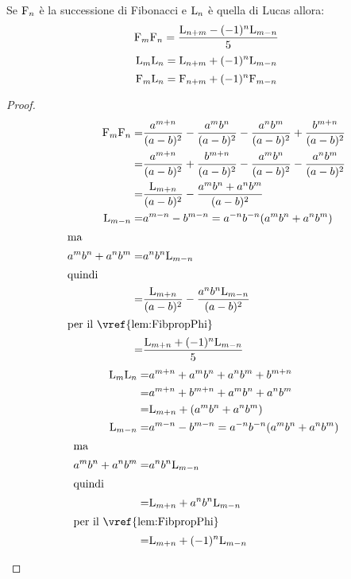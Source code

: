\begin{thm}\label{thm:FibProdSomma}
	Se $\mathrm{F}_{n}$ è la successione di Fibonacci e  $\mathrm{L}_{n}$ è quella di Lucas allora:
	\begin{equation}
		\mathrm{F}_{m}\mathrm{F}_{n}=\dfrac{\mathrm{L}_{n+m}-(-1)^n\mathrm{L}_{m-n}}{5}
	\end{equation}\label{eqn:FibProdSomma}
	\begin{equation}
	\mathrm{L}_{m}\mathrm{L}_{n}=\mathrm{L}_{n+m}+(-1)^n\mathrm{L}_{m-n}
	\end{equation}\label{eqn:LucProdSomma}
\begin{equation}
	\mathrm{F}_{m}\mathrm{L}_{n}=\mathrm{F}_{n+m}+(-1)^n\mathrm{F}_{m-n}
\end{equation}\label{eqn:LucFibProdSomma}
\end{thm}\cite{Rabinowitz_1996}
\begin{proof}
\begin{align*}
	\Fib{m}\Fib{n}=&\dfrac{a^{m+n}}{(a-b)^2}-\dfrac{a^mb^n}{(a-b)^2}-\dfrac{a^nb^m}{(a-b)^2}+\dfrac{b^{m+n}}{(a-b)^2}\\
	=&\dfrac{a^{m+n}}{(a-b)^2}+\dfrac{b^{m+n}}{(a-b)^2}-\dfrac{a^mb^n}{(a-b)^2}-\dfrac{a^nb^m}{(a-b)^2}\\
	=&\dfrac{\Luc{m+n}}{(a-b)^2}-\dfrac{a^mb^n+a^nb^m}{(a-b)^2}\\
	\Luc{m-n}=&a^{m-n}-b^{m-n}=a^{-n}b^{-n}(a^mb^n+a^nb^m)\\
	\intertext{ma}
	a^mb^n+a^nb^m=&a^{n}b^{n}\Luc{m-n}\\
	\intertext{quindi}
	=&\dfrac{\Luc{m+n}}{(a-b)^2}-\dfrac{a^{n}b^{n}\Luc{m-n}}{(a-b)^2}\\
	\intertext{per il~\vref{lem:FibpropPhi}}
	=&\dfrac{\Luc{m+n}+(-1)^{n}\Luc{m-n}}{5}
\end{align*}
\begin{align*}
	\Luc{m}\Luc{n}=&a^{m+n}+a^mb^n+a^nb^m+b^{m+n}\\
	=&a^{m+n}+b^{m+n}+a^mb^n+a^nb^m\\
	=&\Luc{m+n}+(a^mb^n+a^nb^m)\\
	\Luc{m-n}=&a^{m-n}-b^{m-n}=a^{-n}b^{-n}(a^mb^n+a^nb^m)\\
	\intertext{ma}
	a^mb^n+a^nb^m=&a^{n}b^{n}\Luc{m-n}\\
	\intertext{quindi}
	=&\Luc{m+n}+a^{n}b^{n}\Luc{m-n}\\
	\intertext{per il~\vref{lem:FibpropPhi}}
	=&\Luc{m+n}+(-1)^{n}\Luc{m-n}
\end{align*}
\begin{align*}

\end{align*}
\end{proof}
